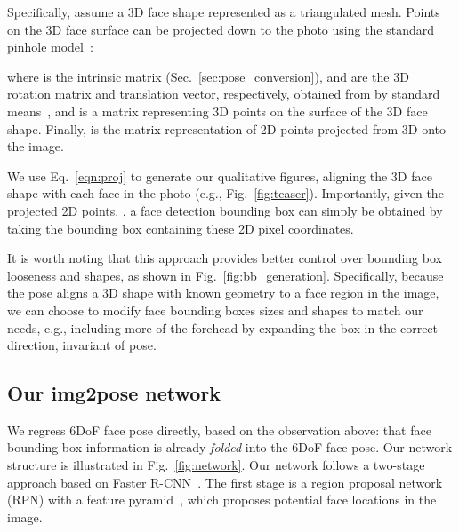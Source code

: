 \documentclass[final]{cvpr}
\begin{document}
Specifically, assume a 3D face shape represented as a triangulated mesh. Points on the 3D face surface can be projected down to the photo using the standard pinhole model~\cite{hartley2003multiple}:

 where  is the intrinsic matrix (Sec.~\ref{sec:pose_conversion}),  and  are the 3D rotation matrix and translation vector, respectively, obtained from  by standard means~\cite{forsyth2002computer,szeliski2010computer}, and  is a matrix representing  3D points on the surface of the 3D face shape. Finally,  is the matrix representation of 2D points projected from 3D onto the image. 

We use Eq.~\eqref{eqn:proj} to generate our qualitative figures, aligning the 3D face shape with each face in the photo (e.g., Fig.~\ref{fig:teaser}). Importantly, given the projected 2D points, , a face detection bounding box can simply be obtained by taking the bounding box containing these 2D pixel coordinates. 

It is worth noting that this approach provides better control over bounding box looseness and shapes, as shown in Fig.~\ref{fig:bb_generation}. Specifically, because the pose aligns a 3D shape with known geometry to a face region in the image, we can choose to modify face bounding boxes sizes and shapes to match our needs, e.g., including more of the forehead by expanding the box in the correct direction, invariant of pose.

\begin{figure}[!t]
\end{figure}


\subsection{Our img2pose network}
\label{sec:network}
We regress 6DoF face pose directly, based on the observation above: that face bounding box information is already {\em folded} into the 6DoF face pose. Our network structure is illustrated in Fig.~\ref{fig:network}. Our network follows a two-stage approach based on Faster R-CNN~\cite{faster_rcnn}. The first stage is a region proposal network (RPN) with a feature pyramid~\cite{fpn}, which proposes potential face locations in the image. 
\end{document}
